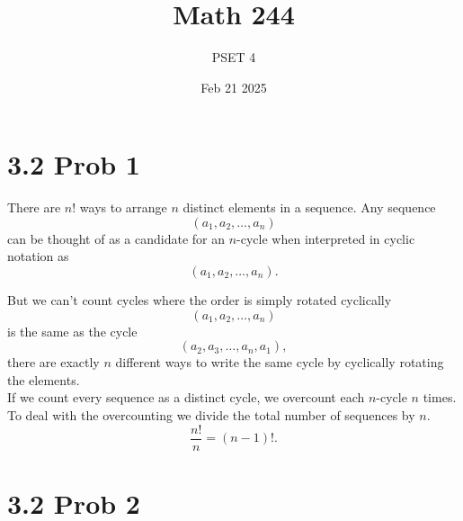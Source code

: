\documentclass{report}
\title{\Huge{Math 244}}
\author{\huge{PSET 4}}
\date{Feb 21 2025}
\begin{document}
\maketitle
\newpage%
\tableofcontents
\pagebreak


\section*{3.2 Prob 1}


\begin{proofWithHibiscus}
  There are \( n! \) ways to arrange \( n \) distinct elements in a sequence. Any sequence
  \[
  (a_1, a_2, \dots, a_n)
  \]
  can be thought of as a candidate for an \( n \)-cycle when interpreted in cyclic notation as
  \[
  (a_1, a_2, \dots, a_n).
  \]
  
  But we can't count cycles where the order is simply rotated cyclically
  \[
  (a_1, a_2, \dots, a_n)
  \]
  is the same as the cycle
  \[
  (a_2, a_3, \dots, a_n, a_1),
  \]
  there are exactly \( n \) different ways to write the same cycle by cyclically rotating the elements. \\
  
  If we count every sequence as a distinct cycle, we overcount each \( n \)-cycle \( n \) times. \\
    
  To deal with the overcounting we divide the total number of sequences by \( n \). 
  \[
  \frac{n!}{n} = (n-1)!.
  \]
  
\end{proofWithHibiscus}


\section*{3.2 Prob 2}

\end{document}

